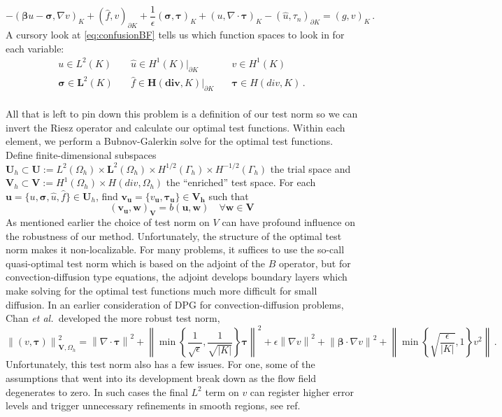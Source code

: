 \documentclass[letterpaper]{article}
\def\btau{\boldsymbol\tau}
\def\bsigma{\boldsymbol\sigma}
\def\bbeta{\boldsymbol\beta}
\newcommand{\bs}[1]{\boldsymbol{#1}}
\newcommand{\eqnref}[1]{\eqref{eq:#1}}
\newcommand{\mb}[1]{\mathbf{#1}}
\newcommand{\norm}[1]{\left\| #1 \right\|}
\def\etal{{\it et al.~}}
\begin{document}
\begin{equation}
\label{eq:confusionBF}
-(\bbeta u-\bsigma,\nabla v)_K+(\hat f,v)_{\partial K}
+ \frac{1}{\epsilon}(\bsigma,\btau)_K
+(u,\nabla\cdot\btau)_K
-(\hat u,\tau_n)_{\partial K}=(g,v)_K\,.
\end{equation}
A cursory look at \eqnref{confusionBF} tells us which function spaces to look
in for each variable:
\[
\begin{array}{lll}
u\in L^2(K) \quad& \hat u\in H^1(K)|_{\partial K} \quad& v\in H^1(K)\\
\bsigma\in \mathbf{L}^2(K) \quad& \hat f\in \bs{H}(\mb{div},K)|_{\partial K} \quad& \btau\in H(div,K)\,.\\
\end{array}
\]

All that is left to pin down this problem is a definition of our test norm so
we can invert the Riesz operator and calculate our optimal test functions.
Within each element, we perform a Bubnov-Galerkin solve for the optimal test
functions. Define finite-dimensional subspaces
$\mb{U}_h\subset\mb{U}:=L^2(\Omega_h)\times\mb{L}^2(\Omega_h)\times
H^{1/2}(\Gamma_h)\times H^{-1/2}(\Gamma_h)$ the trial space and 
$\mb{V}_h\subset\mb{V}:=H^1(\Omega_h)\times H(div,\Omega_h)$ the ``enriched''
test space.
For each $\mathbf{u}=\{u,\bsigma,\hat u,\hat f\}\in\mathbf{U}_h$, find
$\mathbf{v}_{\mathbf{u}}=\{v_\mathbf{u},\btau_\mathbf{u}\}\in\mathbf{V_h}$ such that
\[
(\mathbf{v_u},\mathbf{w})_\mathbf{V}=b(\mathbf{u},\mathbf{w})\quad\forall\mathbf{w}\in\mathbf{V}
\]
As mentioned earlier the choice of test norm on $V$ can have profound
influence on the robustness of our method. Unfortunately, the structure of the
optimal test norm makes it non-localizable. For many problems, it suffices to
use the so-call quasi-optimal test norm which is based on the adjoint of the
$B$ operator, but for convection-diffusion type equations, the adjoint
develops boundary layers which make solving for the optimal test functions
much more difficult for small diffusion. In an earlier consideration of DPG
for convection-diffusion problems, Chan \etal developed the more robust
test norm\cite{ChanHeuerThanhDemkowicz2012}, 
\begin{equation}
\label{eq:robustNorm}
\norm{(v,\btau)}^2_{\mathbf{V},\Omega_h}=
\norm{\nabla\cdot\btau}^2+\norm{\min\left\{\frac{1}{\sqrt{\epsilon}},\frac{1}{\sqrt{|K|}}\right\}\btau}^2
+\epsilon\norm{\nabla v}^2+\norm{\bbeta\cdot\nabla v}^2
+\norm{\min\left\{\sqrt{\frac{\epsilon}{|K|}},1\right\}v^2}\,.
\end{equation}
Unfortunately, this test norm also has a few issues. For one, some of the
assumptions that went into its development break down as the flow field
degenerates to zero. In such cases the final $L^2$ term on $v$ can register
higher error levels and trigger unnecessary refinements in smooth regions, see
ref{}.
\end{document}
